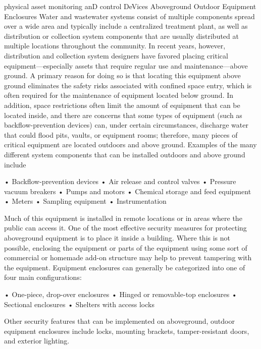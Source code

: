 \documentclass{article}
\begin{document}
physical asset monitoring anD control DeVices Aboveground Outdoor
Equipment Enclosures Water and wastewater systems consist of multiple
components spread over a wide area and typically include a centralized
treatment plant, as well as distribution or collection system components
that are usually distributed at multiple locations throughout the
community. In recent years, however, distribution and collection system
designers have favored placing critical equipment---especially assets
that require regular use and maintenance---above ground. A primary
reason for doing so is that locating this equipment above ground
eliminates the safety risks associated with confined space entry, which
is often required for the maintenance of equipment located below ground.
In addition, space restrictions often limit the amount of equipment that
can be located inside, and there are concerns that some types of
equipment (such as backflow-prevention devices) can, under certain
circumstances, discharge water that could flood pits, vaults, or
equipment rooms; therefore, many pieces of critical equipment are
located outdoors and above ground. Examples of the many different system
components that can be installed outdoors and above ground include

• Backflow-prevention devices • Air release and control valves •
Pressure vacuum breakers • Pumps and motors • Chemical storage and feed
equipment • Meters • Sampling equipment • Instrumentation

Much of this equipment is installed in remote locations or in areas
where the public can access it. One of the most effective security
measures for protecting aboveground equipment is to place it inside a
building. Where this is not possible, enclosing the equipment or parts
of the equipment using some sort of commercial or homemade add-on
structure may help to prevent tampering with the equipment. Equipment
enclosures can generally be categorized into one of four main
configurations:

• One-piece, drop-over enclosures • Hinged or removable-top enclosures •
Sectional enclosures • Shelters with access locks

Other security features that can be implemented on aboveground, outdoor
equipment enclosures include locks, mounting brackets, tamper-resistant
doors, and exterior lighting.
\end{document}
